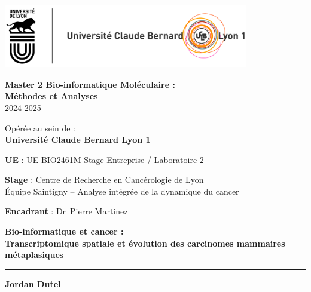 \documentclass[11pt]{article}
\begin{document}
\begin{titlepage}
\begin{center}

\vspace*{-1.5cm}

\includegraphics[width=0.8\textwidth]{logos.jpg}

\vspace{1.2cm}

{\Large\bfseries Master 2 Bio-informatique Moléculaire : \\ Méthodes et Analyses}
\\ 2024-2025

\vspace{0.5cm}

{\large Opérée au sein de : \\[4pt]
\textbf{Université Claude Bernard Lyon 1}}

\vspace{0.8cm}

{\large \textbf{UE} : UE-BIO2461M Stage Entreprise / Laboratoire 2}

\vspace{0.5cm}

{\large \textbf{Stage} : Centre de Recherche en Cancérologie de Lyon \\ 
Équipe Saintigny – Analyse intégrée de la dynamique du cancer}

\vspace{0.5cm}

{\large \textbf{Encadrant} : Dr~Pierre Martinez}

\vspace{1cm}

{\huge\bfseries Bio-informatique et cancer : \\ Transcriptomique spatiale et évolution des carcinomes mammaires métaplasiques}

\vspace{1cm}

\rule{5cm}{1pt}

\vspace{0.5cm}

{\Large \textbf{Jordan Dutel}}

\vfill

\end{center}
\end{titlepage}
\end{document}
